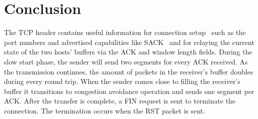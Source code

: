 \section{Conclusion}\label{sec:conclusion}
The TCP header contains useful information for connection setup \textemdash\ such as the port numbers and advertised capabilities like SACK \textemdash\ and for relaying the current state of the two hosts' buffers via the ACK and window length fields.
During the slow start phase, the sender will send two segments for every ACK received.
As the transmission continues, the amount of packets in the receiver's buffer doubles during every round trip.
When the sender comes close to filling the receiver's buffer it transitions to congestion avoidance operation and sends one segment per ACK.\@
After the transfer is complete, a FIN request is sent to terminate the connection.
The termination occurs when the RST packet is sent.

